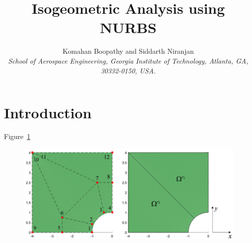 \documentclass[submit]{aiaa-pretty} %
\title{Isogeometric Analysis using NURBS}
\author{Komahan Boopathy  and Siddarth Niranjan\\
  {\normalsize\itshape School of Aerospace Engineering, Georgia Institute of Technology,
    Atlanta, GA, 30332-0150, USA.}\\
}
\begin{document}
\maketitle
\section{Introduction}

Figure~\ref{fig:iga-demo} 
\begin{figure}[h] 
  \centering
  \includegraphics[width=1.0\linewidth]{iga-demo.pdf}
  \caption{\emph{}}
  \label{fig:iga-demo}
\end{figure}



\end{document}
